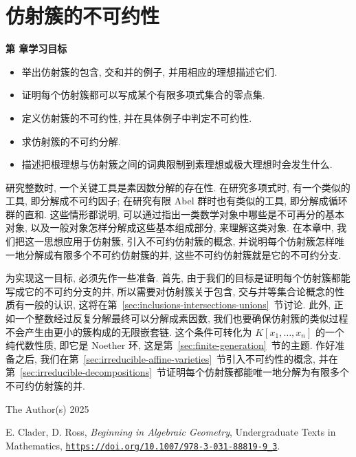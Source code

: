 \chapter{仿射簇的不可约性}\label{chap:irreducibility-of-affine-varieties}

\noindent\textbf{第 \thechapter{} 章学习目标}
\begin{itemize}
  \item 举出仿射簇的包含, 交和并的例子, 并用相应的理想描述它们.
  \item 证明每个仿射簇都可以写成某个有限多项式集合的零点集.
  \item 定义仿射簇的不可约性, 并在具体例子中判定不可约性.
  \item 求仿射簇的不可约分解.
  \item 描述把根理想与仿射簇之间的词典限制到素理想或极大理想时会发生什么.
\end{itemize}

研究整数时, 一个关键工具是素因数分解的存在性. 在研究多项式时, 有一个类似的工具, 即分解成不可约因子; 在研究有限 Abel 群时也有类似的工具, 即分解成循环群的直和. 这些情形都说明, 可以通过指出一类数学对象中哪些是不可再分的基本对象, 以及一般对象怎样分解成这些基本组成部分, 来理解这类对象. 在本章中, 我们把这一思想应用于仿射簇, 引入不可约仿射簇的概念, 并说明每个仿射簇怎样唯一地分解成有限多个不可约仿射簇的并, 这些不可约仿射簇就是它的不可约分支.

为实现这一目标, 必须先作一些准备. 首先, 由于我们的目标是证明每个仿射簇都能写成它的不可约分支的并, 所以需要对仿射簇关于包含, 交与并等集合论概念的性质有一般的认识, 这将在第~\ref{sec:inclusions-intersections-unions}~节讨论. 此外, 正如一个整数经过反复分解最终可以分解成素因数, 我们也要确保仿射簇的类似过程不会产生由更小的簇构成的无限嵌套链. 这个条件可转化为 $K[x_{1},\ldots,x_{n}]$ 的一个纯代数性质, 即它是 Noether 环, 这是第~\ref{sec:finite-generation}~节的主题. 作好准备之后, 我们在第~\ref{sec:irreducible-affine-varieties}~节引入不可约性的概念, 并在第~\ref{sec:irreducible-decompositions}~节证明每个仿射簇都能唯一地分解为有限多个不可约仿射簇的并.

\par\smallskip
{\footnotesize
\noindent\textcopyright{} The Author(s) 2025\par
\noindent E. Clader, D. Ross, \emph{Beginning in Algebraic Geometry}, Undergraduate Texts in Mathematics,
\href{https://doi.org/10.1007/978-3-031-88819-9_3}{\nolinkurl{https://doi.org/10.1007/978-3-031-88819-9_3}}.\par}
